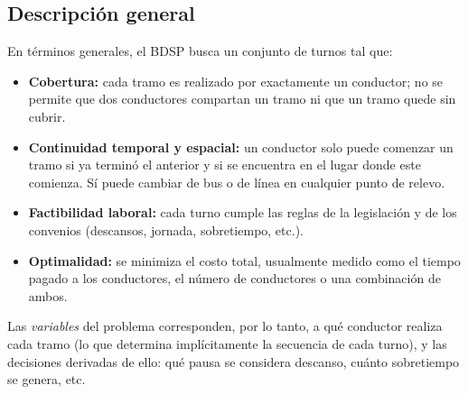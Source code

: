 \documentclass[letter, 10pt]{article}
\begin{document}
\subsection{Descripción general}
En términos generales, el BDSP busca un conjunto de turnos tal que:
\begin{itemize}
\item \textbf{Cobertura:} cada tramo es realizado por exactamente un conductor; no se permite que dos conductores compartan un tramo ni que un tramo quede sin cubrir.
\item \textbf{Continuidad temporal y espacial:} un conductor solo puede comenzar un tramo si ya terminó el anterior y si se encuentra en el lugar donde este comienza. Sí puede cambiar de bus o de línea en cualquier punto de relevo.
\item \textbf{Factibilidad laboral:} cada turno cumple las reglas de la legislación y de los convenios (descansos, jornada, sobretiempo, etc.).
\item \textbf{Optimalidad:} se minimiza el costo total, usualmente medido como el tiempo pagado a los conductores, el número de conductores o una combinación de ambos.
\end{itemize}
Las \emph{variables} del problema corresponden, por lo tanto, a qué conductor realiza cada tramo (lo que determina implícitamente la secuencia de cada turno), y las decisiones derivadas de ello: qué pausa se considera descanso, cuánto sobretiempo se genera, etc.
\end{document}
